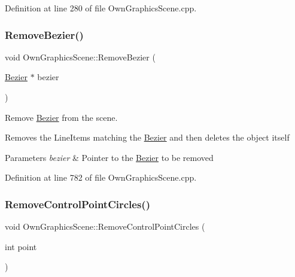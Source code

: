 Definition at line 280 of file Own\+Graphics\+Scene.\+cpp.

\mbox{\label{classOwnGraphicsScene_a24d8270608b0bd56c6155d99d7722ab8}} 
\subsubsection{\texorpdfstring{Remove\+Bezier()}{RemoveBezier()}}
{\footnotesize\ttfamily void Own\+Graphics\+Scene\+::\+Remove\+Bezier (\begin{DoxyParamCaption}\item[{\mbox{\hyperlink{classBezier}{Bezier}} $\ast$}]{bezier }\end{DoxyParamCaption})}



Remove \mbox{\hyperlink{classBezier}{Bezier}} from the scene. 

Removes the Line\+Items matching the \mbox{\hyperlink{classBezier}{Bezier}} and then deletes the object itself 
\begin{DoxyParams}{Parameters}
{\em bezier} & Pointer to the \mbox{\hyperlink{classBezier}{Bezier}} to be removed \\
\hline
\end{DoxyParams}


Definition at line 782 of file Own\+Graphics\+Scene.\+cpp.

\mbox{\label{classOwnGraphicsScene_ad6ad8eaab22c10b1a228f08d8bd5bb68}} 
\subsubsection{\texorpdfstring{Remove\+Control\+Point\+Circles()}{RemoveControlPointCircles()}}
{\footnotesize\ttfamily void Own\+Graphics\+Scene\+::\+Remove\+Control\+Point\+Circles (\begin{DoxyParamCaption}\item[{int}]{point }\end{DoxyParamCaption})}



